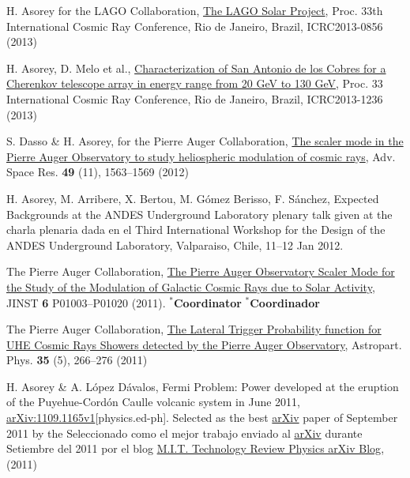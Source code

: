 \begin{etaremune}
\item {}H. Asorey for the LAGO Collaboration, \href{https://www.cbpf.br/~icrc2013/papers/icrc2013-0856.pdf}{The LAGO Solar Project}, \en Proc. 33th International Cosmic Ray Conference, Rio de Janeiro, Brazil, ICRC2013-0856 (2013)

\item {}H. Asorey, D. Melo {{et al.}}, \href{https://www.cbpf.br/~icrc2013/papers/icrc2013-1236.pdf}{Characterization of San Antonio de los Cobres for a Cherenkov telescope array in energy range from 20 GeV to 130 GeV}, \en Proc. 33 International Cosmic Ray Conference, Rio de Janeiro, Brazil, ICRC2013-1236 (2013)

\item {}S. Dasso \& H. Asorey, for the Pierre Auger Collaboration, \href{http://dx.doi.org/10.1016/j.asr.2011.12.028}{{ The scaler mode in
the Pierre Auger Observatory to study heliospheric modulation of cosmic rays}}, Adv. Space Res. {\textbf{49}} (11), 1563--1569 (2012)

\item {} H. Asorey, M. Arribere, X. Bertou, M. Gómez Berisso, F. Sánchez,
{{Expected Backgrounds at the ANDES Underground Laboratory}}
\ifeng
plenary talk given at the
\else 
charla plenaria dada en el
\fi
Third International Workshop for the Design of the ANDES Underground Laboratory, Valparaiso, Chile, 11--12 Jan 2012.

\item {}The Pierre Auger Collaboration,
\href{http://dx.doi.org/10.1088/1748-0221/6/01/P01003}{{The Pierre Auger
Observatory Scaler Mode for the Study of the Modulation of Galactic Cosmic Rays
due to Solar Activity}}, JINST {\textbf 6} P01003--P01020 (2011). \ifeng $^*${\textbf{Coordinator}} \else $^*${\textbf{Coordinador}} \fi

\item {} The Pierre Auger Collaboration, \href{http://dx.doi.org/10.1016/j.astropartphys.2011.08.001}{{The Lateral Trigger Probability function for UHE Cosmic Rays Showers detected by the Pierre Auger Observatory}}, Astropart. Phys. {\textbf{35}} (5), 266--276 (2011)

\item {}H. Asorey \& A. López Dávalos, {{Fermi Problem: Power developed at the eruption of the Puyehue-Cordón Caulle volcanic system in June
2011}}, \href{http://arxiv.org/abs/1109.1165}{arXiv:1109.1165v1}[physics.ed-ph]. \ifeng Selected as the best \href{http://arxiv.org}{arXiv} paper of September 2011 by the \else Seleccionado como el mejor trabajo enviado al \href{http://arxiv.org}{arXiv} durante Setiembre del 2011 por el blog \fi \href{http://www.technologyreview.com/blog/arxiv/27140/}{M.I.T. Technology Review Physics arXiv Blog}, (2011)


\end{etaremune}

